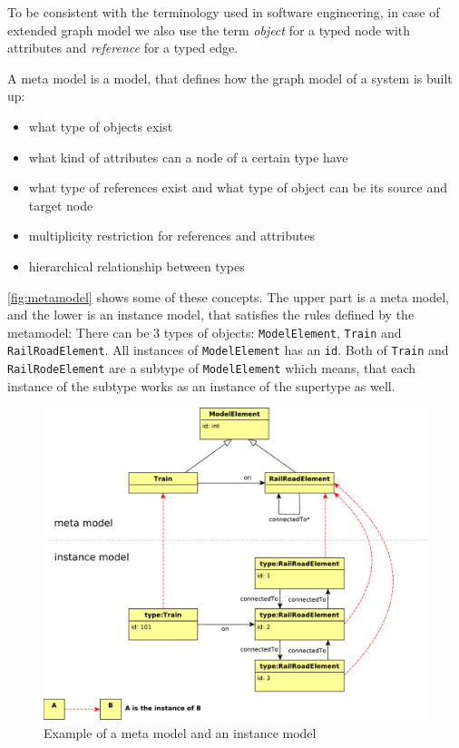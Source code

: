 To be consistent with the terminology used in software engineering, in case of  extended graph model we also use the term \emph{object} for a typed node with attributes and \emph{reference} for a typed edge. 

A meta model is a model, that defines how the graph model of a system is built up:
\begin{itemize}
	\item what type of objects exist
	\item what kind of attributes can a node of a certain type have
	\item what type of references exist and what type of object can be its source and target node
	\item multiplicity restriction for references and attributes
	\item hierarchical relationship between types
\end{itemize}

\autoref{fig:metamodel} shows some of these concepts. The upper part is a meta model, and the lower is an instance model, that satisfies the rules defined by the metamodel: There can be 3 types of objects: \texttt{ModelElement}, \texttt{Train} and \texttt{RailRoadElement}. All instances of \texttt{ModelElement} has an \texttt{id}. Both of \texttt{Train} and \texttt{RailRodeElement} are a subtype of \texttt{ModelElement} which means, that each instance of the subtype works as an instance of the supertype as well.
\begin{figure}[h]
	\begin{center}
		\includegraphics[width=\textwidth]{figures/metamodel.pdf}
		\caption{ Example of a meta model and an instance model }
		\label{fig:metamodel}
	\end{center}
\end{figure}


